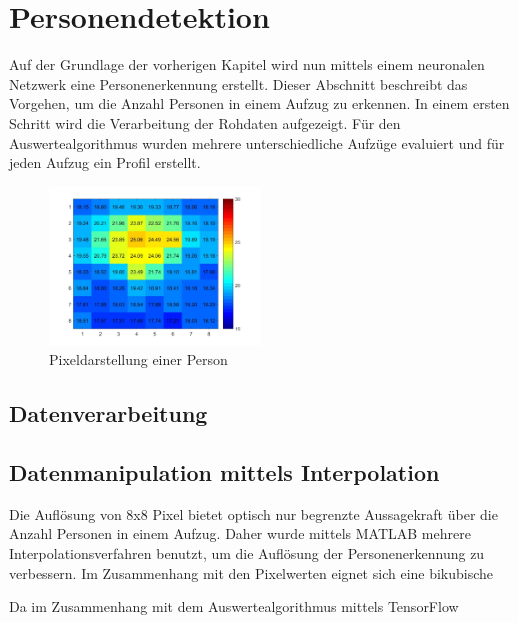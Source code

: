 \chapter{Personendetektion}
\label{chap:Personendetektion}

Auf der Grundlage der vorherigen Kapitel wird nun mittels einem neuronalen Netzwerk eine Personenerkennung erstellt. Dieser Abschnitt beschreibt das Vorgehen, um die Anzahl Personen in einem Aufzug zu erkennen. In einem ersten Schritt wird die Verarbeitung der Rohdaten aufgezeigt. Für den Auswertealgorithmus wurden mehrere unterschiedliche Aufzüge evaluiert und für jeden Aufzug ein Profil erstellt. 



\begin{figure}[H]
	\centering
	\includegraphics[width=0.5\textwidth]
	{fig/person_175_shirt.jpg}
	\caption[Pixeldarstellung einer Person]{Pixeldarstellung einer Person}
	\label{fig:Pixelbild}
\end{figure}



\section{Datenverarbeitung}




\section{Datenmanipulation mittels Interpolation}

Die Auflösung von 8x8 Pixel bietet optisch nur begrenzte Aussagekraft über die Anzahl Personen in einem Aufzug. Daher wurde mittels MATLAB mehrere Interpolationsverfahren benutzt, um die Auflösung der Personenerkennung zu verbessern. Im Zusammenhang mit den Pixelwerten eignet sich eine bikubische



Da im Zusammenhang mit dem Auswertealgorithmus mittels TensorFlow



